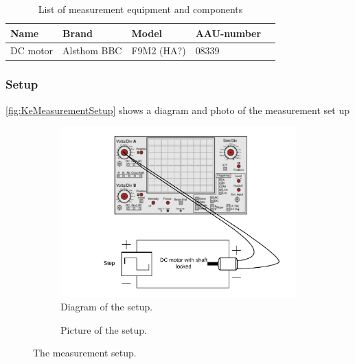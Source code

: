\begin{table}[htbp]
	\centering
	\caption{List of measurement equipment and components}\label{tab_appendix:LaSetUp}
	
	\begin{tabularx}{\textwidth}{lXXXX}
		Name 				& Brand	& Model & AAU-number									\\ \toprule \rowcolor{lightGrey}
		
		DC motor & Alsthom BBC & F9M2 (HA?)& 08339 
	\end{tabularx}
\end{table}


\subsubsection*{Setup}
\autoref{fig:KeMeasurementSetup} shows a diagram and photo of the measurement set up
\begin{figure}[htbp]
	\centering
	\begin{subfigure}{0.50\textwidth}
		\includegraphics[width=\textwidth]{figures/appendix/Motor&GearTests/RmLmDiagram}
		\caption{Diagram of the setup.} \label{fig:RmLmMeasurementDiagram}
	\end{subfigure}
	\begin{subfigure}{0.40\textwidth}
		\caption{Picture of the setup.} \label{fig:RmLmMeasurementPictures}
	\end{subfigure}
	\caption{The measurement setup.} \label{fig:RmLmMeasurementSetup}   
\end{figure}

